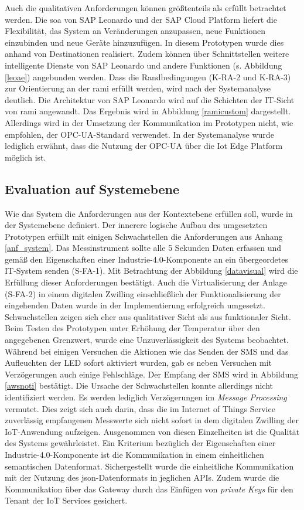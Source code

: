 Auch die qualitativen Anforderungen können größtenteils als erfüllt betrachtet werden. Die \ac{soa} von SAP Leonardo und der SAP Cloud Platform liefert die Flexibilität, das System an Veränderungen anzupassen, neue Funktionen einzubinden und neue Geräte hinzuzufügen. In diesem Prototypen wurde dies anhand von Destinationen realisiert. Zudem können über Schnittstellen weitere intelligente Dienste von SAP Leonardo und andere Funktionen (s. Abbildung \ref{leoae}) angebunden werden. Dass die Randbedingungen (K-RA-2 und K-RA-3) zur Orientierung an der \ac{rami} erfüllt werden, wird nach der Systemanalyse deutlich. Die Architektur von SAP Leonardo wird auf die Schichten der IT-Sicht von \ac{rami} angewandt. Das Ergebnis wird in Abbildung \ref{ramicustom} dargestellt. Allerdings wird in der Umsetzung der Kommunikation im Prototypen nicht, wie empfohlen, der OPC-UA-Standard verwendet. In der Systemanalyse wurde lediglich erwähnt, dass die Nutzung der OPC-UA über die Iot Edge Platform möglich ist.

\subsection{Evaluation auf Systemebene}

Wie das System die Anforderungen aus der Kontextebene erfüllen soll, wurde in der Systemebene definiert. Der innerere logische Aufbau des umgesetzten Prototypen erfüllt mit einigen Schwachstellen die Anforderungen aus Anhang \ref{anf_system}.
Das Messinstrument sollte alle 5 Sekunden Daten erfassen und gemäß den Eigenschaften einer Industrie-4.0-Komponente an ein übergeordetes IT-System senden (S-FA-1). Mit Betrachtung der Abbildung \ref{datavisual} wird die Erfüllung dieser Anforderungen bestätigt. Auch die Virtualisierung der Anlage (S-FA-2) in einem digitalen Zwilling einschließlich der Funktionalisierung der eingehenden Daten wurde in der Implementierung erfolgreich umgesetzt. 
Schwachstellen zeigen sich eher aus qualitativer Sicht als aus funktionaler Sicht. Beim Testen des Prototypen unter Erhöhung der Temperatur über den angegebenen Grenzwert, wurde eine Unzuverlässigkeit des Systems beobachtet. Während bei einigen Versuchen die Aktionen wie das Senden der SMS und das Aufleuchten der LED sofort aktiviert wurden, gab es neben Versuchen mit Verzögerungen auch einige Fehlschläge. Der Empfang der SMS wird in Abbildung \ref{awsnoti} bestätigt. Die Ursache der Schwachstellen konnte allerdings nicht identifiziert werden. Es werden lediglich Verzögerungen im \textit{Message Processing} vermutet. Dies zeigt sich auch darin, dass die im Internet of Things Service zuverlässig empfangenen Messwerte sich nicht sofort in dem digitalen Zwilling der IoT-Anwendung aufzeigen. Ausgenommen von diesen Einzelheiten ist die Qualität des Systems gewährleistet. Ein Kriterium bezüglich der Eigenschaften einer Industrie-4.0-Komponente ist die Kommunikation in einem einheitlichen semantischen Datenformat. Sichergestellt wurde die einheitliche Kommunikation mit der Nutzung des \ac{json}-Datenformats in jeglichen APIs. Zudem wurde die Kommunikation über das Gateway durch das Einfügen von \textit{private Keys} für den Tenant der IoT Services gesichert. 



